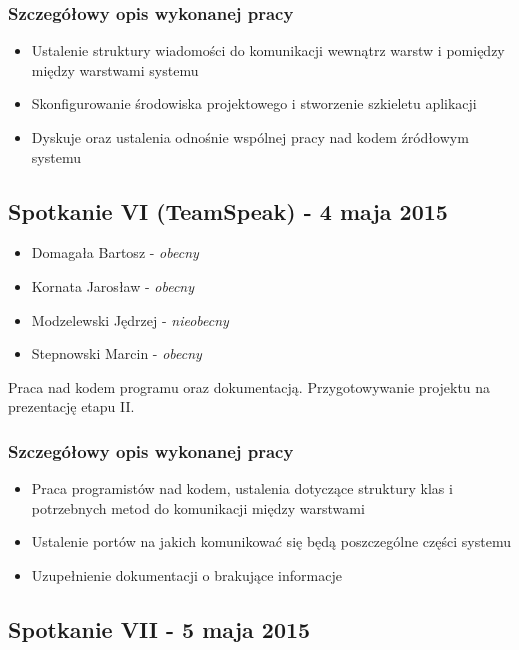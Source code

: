 \subsubsection*[Szczegółowy opis wykonanej pracy]{Szczegółowy opis wykonanej pracy}
\begin{itemize}
\item Ustalenie struktury wiadomości do komunikacji wewnątrz warstw i pomiędzy między warstwami systemu
\item Skonfigurowanie środowiska projektowego i stworzenie szkieletu aplikacji
\item Dyskuje oraz ustalenia odnośnie wspólnej pracy nad kodem źródłowym systemu
\end{itemize}

\subsection[Spotkanie VI (TeamSpeak) - 4 maja 2015]{Spotkanie VI (TeamSpeak) - 4 maja 2015}

\begin{itemize}
\item Domagała Bartosz - \textit{obecny}
\item Kornata Jarosław - \textit{obecny}
\item Modzelewski Jędrzej - \textit{nieobecny}
\item Stepnowski Marcin - \textit{obecny}
\end{itemize}

\par{Praca nad kodem programu oraz dokumentacją. Przygotowywanie projektu na prezentację etapu II.}

\subsubsection*[Szczegółowy opis wykonanej pracy]{Szczegółowy opis wykonanej pracy}
\begin{itemize}
\item Praca programistów nad kodem, ustalenia dotyczące struktury klas i potrzebnych metod do komunikacji między warstwami
\item Ustalenie portów na jakich komunikować się będą poszczególne części systemu
\item Uzupełnienie dokumentacji o brakujące informacje
\end{itemize}


\subsection[Spotkanie VII - 5 maja 2015]{Spotkanie VII - 5 maja 2015}

